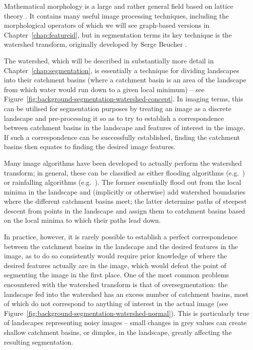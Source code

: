 Mathematical morphology is a large and rather general field based on lattice theory \cite{goutsias00}. It contains many useful image processing techniques, including the morphological operators of which we will see graph-based versions in Chapter~\ref{chap:featureid}, but in segmentation terms its key technique is the watershed transform, originally developed by Serge Beucher \cite{beucher90}.

The watershed, which will be described in substantially more detail in Chapter~\ref{chap:segmentation}, is essentially a technique for dividing landscapes into their catchment basins (where a catchment basin is an area of the landscape from which water would run down to a given local minimum) -- see Figure~\ref{fig:background-segmentation-watershed-concept}. In imaging terms, this can be utilised for segmentation purposes by treating an image as a discrete landscape and pre-processing it so as to try to establish a correspondence between catchment basins in the landscape and features of interest in the image. If such a correspondence can be successfully established, finding the catchment basins then equates to finding the desired image features.


Many image algorithms have been developed to actually perform the watershed transform; in general, these can be classified as either flooding algorithms (e.g.~\cite{bieniek00,rambabu07}) or rainfalling algorithms (e.g.~\cite{meijster98,osma-ruiz06,stoev00}). The former essentially flood out from the local minima in the landscape and (implicitly or otherwise) add watershed boundaries where the different catchment basins meet; the latter determine paths of steepest descent from points in the landscape and assign them to catchment basins based on the local minima to which their paths lead down.

In practice, however, it is rarely possible to establish a perfect correspondence between the catchment basins in the landscape and the desired features in the image, as to do so consistently would require prior knowledge of where the desired features actually are in the image, which would defeat the point of segmenting the image in the first place. One of the most common problems encountered with the watershed transform is that of oversegmentation: the landscape fed into the watershed has an excess number of catchment basins, most of which do not correspond to anything of interest in the actual image (see Figure~\ref{fig:background-segmentation-watershed-normal}). This is particularly true of landscapes representing noisy images -- small changes in grey values can create shallow catchment basins, or dimples, in the landscape, greatly affecting the resulting segmentation.

